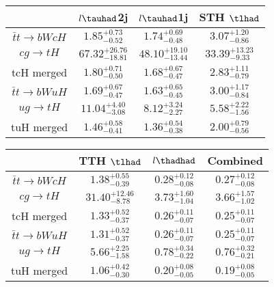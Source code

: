 \centering
\begin{tabular}{|c|c|c|c|} \hline
 & $l\tauhad$2j & $l\tauhad$1j & STH $\tlhad$\\\hline
$\bar{t}t\to bWcH$ & $1.85^{+0.73}_{-0.52}$ & $1.74^{+0.69}_{-0.48}$ & $3.07^{+1.20}_{-0.86}$\\\hline
$cg\to tH$ & $67.32^{+26.76}_{-18.81}$ & $48.10^{+19.10}_{-13.44}$ & $33.39^{+13.23}_{-9.33}$\\\hline
tcH merged & $1.80^{+0.71}_{-0.50}$ & $1.68^{+0.67}_{-0.47}$ & $2.83^{+1.11}_{-0.79}$\\\hline
$\bar{t}t\to bWuH$ & $1.69^{+0.67}_{-0.47}$ & $1.63^{+0.65}_{-0.45}$ & $3.00^{+1.17}_{-0.84}$\\\hline
$ug\to tH$ & $11.04^{+4.40}_{-3.08}$ & $8.12^{+3.24}_{-2.27}$ & $5.58^{+2.22}_{-1.56}$\\\hline
tuH merged & $1.46^{+0.58}_{-0.41}$ & $1.36^{+0.54}_{-0.38}$ & $2.00^{+0.79}_{-0.56}$\\\hline
\end{tabular}
\begin{tabular}{|c|c|c|c|} \hline
 & TTH $\tlhad$ & $l\thadhad$ & Combined\\\hline
$\bar{t}t\to bWcH$ & $1.38^{+0.55}_{-0.39}$ & $0.28^{+0.12}_{-0.08}$ & $0.27^{+0.12}_{-0.08}$\\\hline
$cg\to tH$ & $31.40^{+12.46}_{-8.78}$ & $3.73^{+1.60}_{-1.04}$ & $3.66^{+1.57}_{-1.02}$\\\hline
tcH merged & $1.33^{+0.52}_{-0.37}$ & $0.26^{+0.11}_{-0.07}$ & $0.25^{+0.11}_{-0.07}$\\\hline
$\bar{t}t\to bWuH$ & $1.31^{+0.52}_{-0.37}$ & $0.26^{+0.11}_{-0.07}$ & $0.25^{+0.11}_{-0.07}$\\\hline
$ug\to tH$ & $5.66^{+2.25}_{-1.58}$ & $0.78^{+0.34}_{-0.22}$ & $0.76^{+0.32}_{-0.21}$\\\hline
tuH merged & $1.06^{+0.42}_{-0.30}$ & $0.20^{+0.08}_{-0.05}$ & $0.19^{+0.08}_{-0.05}$\\\hline
\end{tabular}
